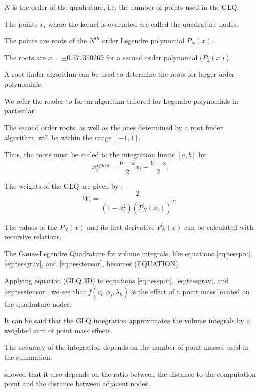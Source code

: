 \documentclass[paper,twocolumn]{geophysics}
\begin{document}
$N$ is the order of the quadrature, i.e. the number of points used in the GLQ.

The points $x_i$ where the kernel is evaluated are called the quadrature nodes.

The points are roots of the $N^{th}$ order Legendre polynomial $P_N(x)$.

The roots are $x = \pm 0.577350269$ for a second order polynomial ($P_2(x)$).

A root finder algorithm can be used to determine the roots for larger order
polynomials.

We refer the reader to \citet{Barrera-Figueroa2006} for an algorithm tailored
for Legendre polynomials in particular.

The second order roots, as well as the ones determined by a root finder
algorithm, will be within the range $[-1, 1]$.

Thus, the roots must be scaled to the integration limits $[a, b]$ by
\begin{equation}
    x^{scaled}_i = \frac{b - a}{2} x_i + \frac{b + a}{2}.
    \label{eq:glq_scaling}
\end{equation}

The weights of the GLQ are given by \citep{Hildebrand1987},
\begin{equation}
    W_i = \frac{2}{(1 - x_i^2)(P^\prime_N(x_i))^2},
    \label{eq:glq_weights}
\end{equation}

The values of the $P_N(x)$ and its first derivative $P^\prime_N(x)$ can be
calculated with recursive relations.

The Gauss-Legendre Quadrature for volume integrals, like equations
\ref{eq:tesspot}, \ref{eq:tessgrav}, and \ref{eq:tesstensor},
becomes \citep{Asgharzadeh2007} (EQUATION).

Applying equation (GLQ 3D) to equations
\ref{eq:tesspot}, \ref{eq:tessgrav}, and \ref{eq:tesstensor},
we see that $f(r_i, \phi_j, \lambda_k)$ is the effect of a point
mass located on the quadrature nodes.

It can be said that the GLQ integration approximates the volume integrals  by a
weighted sum of point mass effects.


The accuracy of the integration
depends on the number of point masses used in the summation.

\citet{Ku1977} showed that it also depends on the ratio between
the distance to the computation point and the distance between adjacent nodes.
\end{document}
